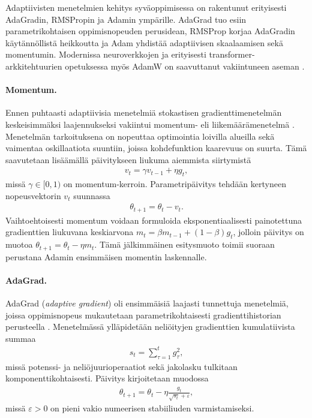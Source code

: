 Adaptiivisten menetelmien kehitys syväoppimisessa on rakentunut
erityisesti AdaGradin, RMSPropin ja Adamin ympärille. AdaGrad tuo esiin
parametrikohtaisen oppimisnopeuden perusidean, RMSProp korjaa AdaGradin
käytännöllistä heikkoutta ja Adam yhdistää adaptiivisen skaalaamisen sekä
momentumin. Modernissa neuroverkkojen ja erityisesti
transformer-arkkitehtuurien opetuksessa myös AdamW on saavuttanut
vakiintuneen aseman
\cite{duchi2011adaptive,tieleman2012lecture,kingma2015adam,
loshchilov2019decoupled, vaswani2017attention}.

\paragraph{Momentum.}

Ennen puhtaasti adaptiivisia menetelmiä stokastisen gradienttimenetelmän
keskeisimmäksi laajennukseksi vakiintui momentum- eli liikemäärämenetelmä
\cite{sutskever2013importance}. Menetelmän tarkoituksena on
nopeuttaa optimointia loivilla alueilla sekä vaimentaa oskillaatiota
suuntiin, joissa kohdefunktion kaarevuus on suurta. Tämä saavutetaan
lisäämällä päivitykseen liukuma aiemmista siirtymistä
\begin{align*}
  v_t
  =
  \gamma v_{t-1} + \eta g_t,
\end{align*}
missä \(\gamma\in[0,1)\) on momentum-kerroin. Parametripäivitys tehdään
kertyneen nopeusvektorin \(v_t\) suunnassa
\begin{align*}
  \theta_{t+1}
  =
  \theta_t - v_t.
\end{align*}
Vaihtoehtoisesti momentum voidaan formuloida eksponentiaalisesti painotettuna
gradienttien liukuvana keskiarvona \(m_t = \beta m_{t-1} + (1-\beta)g_t\),
jolloin päivitys on muotoa \(\theta_{t+1} = \theta_t - \eta m_t\). Tämä
jälkimmäinen esitysmuoto toimii suoraan perustana Adamin ensimmäisen momentin
laskennalle.

\paragraph{AdaGrad.}

AdaGrad (\emph{adaptive gradient}) oli ensimmäisiä laajasti tunnettuja
menetelmiä, joissa oppimisnopeus mukautetaan parametrikohtaisesti
gradienttihistorian perusteella \cite{duchi2011adaptive}. Menetelmässä
ylläpidetään neliöityjen gradienttien kumulatiivista summaa
\begin{align*}
  s_t
  =
  \sum_{\tau=1}^t g_\tau^2,
\end{align*}
missä potenssi- ja neliöjuurioperaatiot sekä jakolasku tulkitaan
komponenttikohtaisesti. Päivitys kirjoitetaan muodossa
\begin{align*}
  \theta_{t+1}
  =
  \theta_t
  -
  \eta
  \frac{g_t}{\sqrt{s_t}+\varepsilon},
\end{align*}
missä \(\varepsilon>0\) on pieni vakio numeerisen stabiiliuden
varmistamiseksi.

